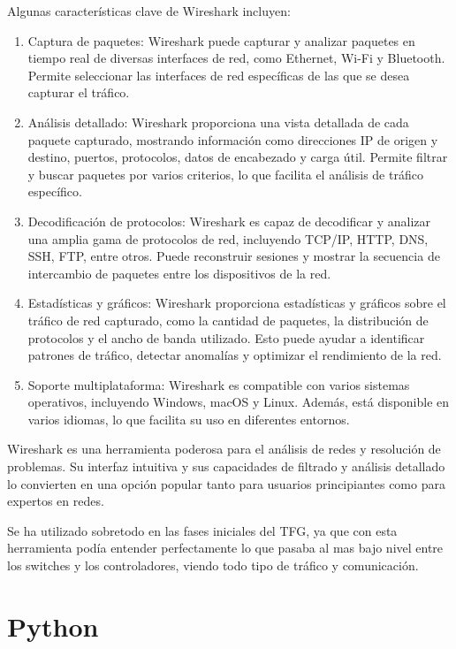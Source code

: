 \documentclass[a4paper, 12pt]{book}
\begin{document}
	Algunas características clave de Wireshark incluyen:
	
	\begin{enumerate}
		\item 	Captura de paquetes: Wireshark puede capturar y analizar paquetes en tiempo real de diversas interfaces de red, como Ethernet, Wi-Fi y Bluetooth. Permite seleccionar las interfaces de red específicas de las que se desea capturar el tráfico.	
		\item 	Análisis detallado: Wireshark proporciona una vista detallada de cada paquete capturado, mostrando información como direcciones IP de origen y destino, puertos, protocolos, datos de encabezado y carga útil. Permite filtrar y buscar paquetes por varios criterios, lo que facilita el análisis de tráfico específico.
		\item 	Decodificación de protocolos: Wireshark es capaz de decodificar y analizar una amplia gama de protocolos de red, incluyendo TCP/IP, HTTP, DNS, SSH, FTP, entre otros. Puede reconstruir sesiones y mostrar la secuencia de intercambio de paquetes entre los dispositivos de la red.
		\item 	Estadísticas y gráficos: Wireshark proporciona estadísticas y gráficos sobre el tráfico de red capturado, como la cantidad de paquetes, la distribución de protocolos y el ancho de banda utilizado. Esto puede ayudar a identificar patrones de tráfico, detectar anomalías y optimizar el rendimiento de la red.
		\item   Soporte multiplataforma: Wireshark es compatible con varios sistemas operativos, incluyendo Windows, macOS y Linux. Además, está disponible en varios idiomas, lo que facilita su uso en diferentes entornos.
	\end{enumerate}
	
	
	Wireshark es una herramienta poderosa para el análisis de redes y resolución de problemas. Su interfaz intuitiva y sus capacidades de filtrado y análisis detallado lo convierten en una opción popular tanto para usuarios principiantes como para expertos en redes.
	
	Se ha utilizado sobretodo en las fases iniciales del TFG, ya que con esta herramienta podía entender perfectamente lo que pasaba al mas bajo nivel entre los switches y los controladores, viendo todo tipo de tráfico y comunicación.	
	
	\section{Python} 
	\label{sec:python}
	
\end{document}
